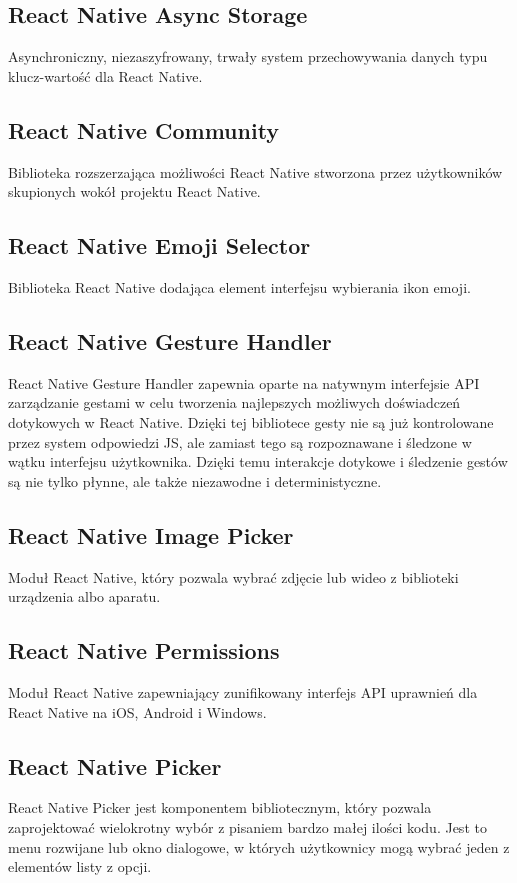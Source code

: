 \documentclass[12pt,a4paper]{article}
\begin{document}
		\subsection{React Native Async Storage}
			\indent Asynchroniczny, niezaszyfrowany, trwały system przechowywania danych typu klucz-wartość dla React Native.
		\subsection{React Native Community}
			\indent Biblioteka rozszerzająca możliwości React Native stworzona przez użytkowników skupionych wokół projektu React Native.
		\subsection{React Native Emoji Selector}
			\indent Biblioteka React Native dodająca element interfejsu wybierania ikon emoji. 
		\subsection{React Native Gesture Handler}
			\indent React Native Gesture Handler zapewnia oparte na natywnym interfejsie API zarządzanie gestami w celu tworzenia najlepszych możliwych
			doświadczeń dotykowych w React Native. Dzięki tej bibliotece gesty nie są już kontrolowane przez system odpowiedzi JS, ale zamiast tego są rozpoznawane i śledzone
			w wątku interfejsu użytkownika. Dzięki temu interakcje dotykowe i śledzenie gestów są nie tylko płynne, ale także niezawodne i deterministyczne.
		\subsection{React Native Image Picker}
			\indent Moduł React Native, który pozwala wybrać zdjęcie lub wideo z biblioteki urządzenia albo aparatu. 
		\subsection{React Native Permissions}
			\indent Moduł React Native zapewniający zunifikowany interfejs API uprawnień dla React Native na iOS, Android i Windows.
		\subsection{React Native Picker}
			\indent React Native Picker jest komponentem bibliotecznym, który pozwala zaprojektować wielokrotny wybór z pisaniem bardzo małej ilości kodu. Jest to menu rozwijane lub
			okno dialogowe, w których użytkownicy mogą wybrać jeden z elementów listy z opcji.
\end{document}
